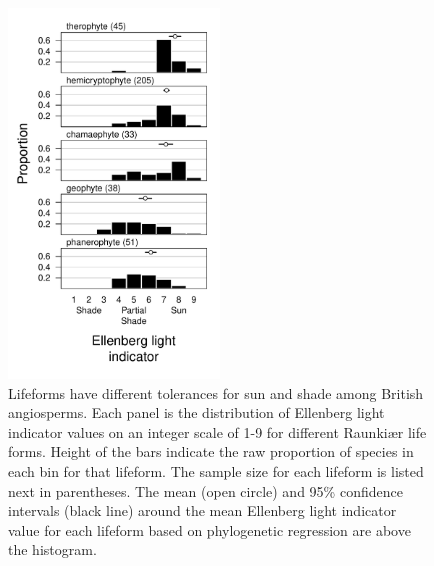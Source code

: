 \documentclass[12pt, oneside]{article}
\begin{document}
\begin{figure}[ht]
\centerline{\includegraphics[width=0.5\textwidth]{figures/figure_lf-light.pdf}}
\caption{Lifeforms have different tolerances for sun and shade among British angiosperms. Each panel is the distribution of Ellenberg light indicator values on an integer scale of 1-9 for different Raunki\ae r life forms. Height of the bars indicate the raw proportion of species in each bin for that lifeform. The sample size for each lifeform is listed next in parentheses. The mean (open circle) and 95\% confidence intervals (black line) around the mean Ellenberg light indicator value for each lifeform based on phylogenetic regression are above the histogram.} 
\label{fig:lf-light}
\end{figure}
\end{document}
